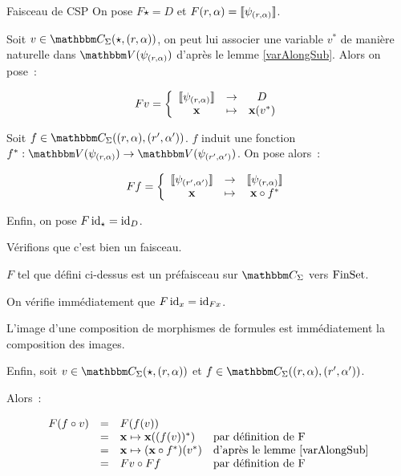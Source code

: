 \begin{defi}{Faisceau de CSP}
    On pose $F\star = D$ et $F(r,\alpha) = \llbracket {\psi_{(r,\alpha)}} \rrbracket$.

    Soit $v\in\C_\Sigma(\star, (r,\alpha))$, on peut lui associer une variable
    $v^*$ de manière naturelle dans $\V(\psi_{(r,\alpha)})$ d'après le lemme 
    \ref{varAlongSub}. Alors on pose~:
    
    \[ Fv = \left\{\begin{array}{ccc}
                       \llbracket {\psi_{(r,\alpha)}} \rrbracket & \rightarrow & D              \\
                             \mathbf{x}        & \mapsto     & \mathbf{x}(v^*) \\
    \end{array}\right.\]

    Soit $f\in\C_\Sigma((r,\alpha), (r',\alpha'))$. $f$ induit une fonction
    $f^* : \V(\psi_{(r,\alpha)})\rightarrow\V(\psi_{(r',\alpha')})$. On pose alors~:

    \[ Ff = \left\{\begin{array}{ccc}
                    \llbracket {\psi_{(r',\alpha')}} \rrbracket & \rightarrow & \llbracket {\psi_{(r,\alpha)}} \rrbracket \\
                           \mathbf{x}         & \mapsto     & \mathbf{x} \circ f^* \\
    \end{array}\right.\]

    Enfin, on pose $F\operatorname{id}_\star = \operatorname{id}_D$.
\end{defi}

Vérifions que c'est bien un faisceau.

\begin{lem}
    $F$ tel que défini ci-dessus est un préfaisceau sur $\C_\Sigma$ vers $\text{FinSet}$.
\end{lem}

\begin{pv}
    On vérifie immédiatement que $F\operatorname{id}_x = \operatorname{id}_{Fx}$.

    L'image d'une composition de morphismes de formules est immédiatement la composition
    des images.

    Enfin, soit $v\in\C_\Sigma(\star, (r,\alpha))$ et
    $f\in\C_\Sigma((r,\alpha), (r',\alpha'))$.

    Alors~:
    
    \[\begin{array}{rcll}
        F(f\circ v) & = & F(f(v)) & \\
                    & = & \mathbf{x}\mapsto \mathbf{x}((f(v))^*) 
                            & \text{par définition de F} \\
                    & = & \mathbf{x}\mapsto (\mathbf{x}\circ f^*)(v^*)
                            & \text{d'après le lemme \ref{varAlongSub}} \\
                    & = & Fv \circ Ff & \text{par définition de F} \\
    \end{array}\]
\end{pv}

